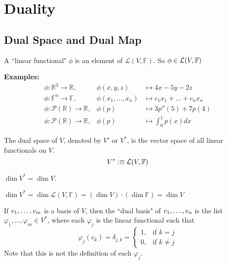 
\section{Duality}
\subsection{Dual Space and Dual Map}

\setcounter{thm}{107}
\begin{mydef}
  A ``linear functional" $\phi$ is an element of $\mathcal{L}(V, \mathbb{F})$. So $\phi \in \mathcal{L}(V, \mathbb{F})$
\end{mydef}

\textbf{Examples:}
\begin{equation}
  \begin{array}{lll}
    \phi: \mathbb{R}^3  \to \mathbb{R}, &\phi (x,y,z)  & \mapsto 4x-5y-2z \\
    \phi: \mathbb{F}^n  \to \mathbb{F}, &\phi (x_1, \dots, x_n)
    & \mapsto c_1x_1 + \dots + c_nx_n  \\
    \phi: \mathcal{P} (\mathbb{R})  \to \mathbb{R},
    & \phi(p) & \mapsto 3p''(5) + 7p(4) \\
    \phi: \mathcal{P}(\mathbb{R}) \to \mathbb{R},
    & \phi(p)  &\mapsto \textstyle \int_{0}^{1} p(x) dx
  \end{array}
\end{equation}

\setcounter{thm}{109}
\begin{thm}
  The dual space of $V$, denoted by $V'$ or $V^{*}$, is the vector space of all linear functionals on $V$.
  \begin{equation}
    V^{*} :\equiv \mathcal{L}(V, \mathbb{F})
  \end{equation}
\end{thm}

\begin{thm}
  $\dim V^{*} = \dim V$.
\end{thm}
\begin{prf}
  $\dim V^{*} = \dim \mathcal{L}(V, \mathbb{F})=(\dim V) \cdot (\dim \mathbb{F}) = \dim V $
\end{prf}


\begin{mydef}
  If $v_1, \dots, v_m$ is a basis of $V$, then the ``dual basis" of $v_1, \dots, v_n$ is the list $\varphi_1, \dots, \varphi_m \in V^{*}$, where each $\varphi_j$ is the linear functional such that
  \begin{equation}
    \varphi_j(v_k) = \delta_{j,k} =
  \begin{cases}
    1,  & \text{if $k=j$} \\
    0, & \text{if $k \neq j$}
  \end{cases}
  \end{equation}
  Note that this is not the definition of each $\varphi_j$.
\end{mydef}

